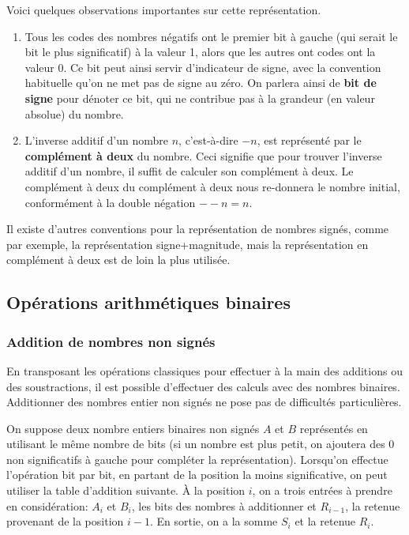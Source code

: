 \documentclass[11pt]{article}
\begin{document}
Voici quelques observations importantes sur cette représentation.

\begin{enumerate}
\item Tous les codes des nombres négatifs ont le premier bit à gauche
(qui serait le bit le plus significatif) à la valeur 1, alors que
les autres ont codes ont la valeur 0. Ce bit peut ainsi servir
d'indicateur de signe, avec la convention habituelle qu'on ne met
pas de signe au zéro. On parlera ainsi de \textbf{bit de signe} pour
dénoter ce bit, qui ne contribue pas à la grandeur (en valeur
absolue) du nombre.

\item L'inverse additif d'un nombre \(n\), c'est-à-dire \(-n\), est
représenté par le \textbf{complément à deux} du nombre. Ceci signifie que
pour trouver l'inverse additif d'un nombre, il suffit de calculer
son complément à deux. Le complément à deux du complément à deux nous
re-donnera le nombre initial, conformément à la double négation
\(--n = n\).
\end{enumerate}

Il existe d'autres conventions pour la représentation de nombres
signés, comme par exemple, la représentation signe+magnitude, mais la
représentation en complément à deux est de loin la plus utilisée.

\subsection{Opérations arithmétiques binaires}
\label{sec:org7bdbb75}

\subsubsection{Addition de nombres non signés}
\label{sec:org6c87b98}

En transposant les opérations classiques pour effectuer à la main des
additions ou des soustractions, il est possible d'effectuer des
calculs avec des nombres binaires. Additionner des nombres entier non
signés ne pose pas de difficultés particulières.

On suppose deux nombre entiers binaires non signés \(A\) et \(B\)
représentés en utilisant le même nombre de bits (si un nombre est plus
petit, on ajoutera des 0 non significatifs à gauche pour compléter la
représentation). Lorsqu'on effectue l'opération bit par bit, en
partant de la position la moins significative, on peut utiliser la
table d'addition suivante. À la position \(i\), on a trois entrées à
prendre en considération: \(A_{i}\) et \(B_{i}\), les bits des nombres
à additionner et \(R_{i-1}\), la retenue provenant de la position
\(i-1\). En sortie, on a la somme \(S_{i}\) et la retenue \(R_{i}\).
\end{document}
